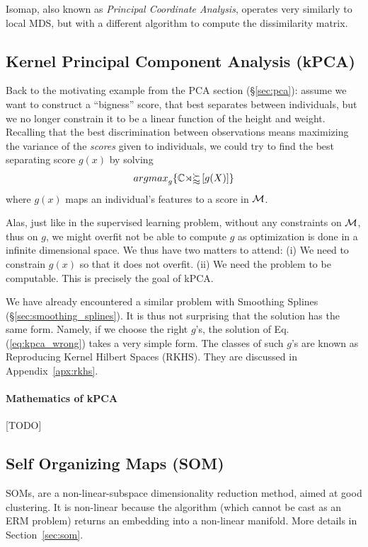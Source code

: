 \documentclass[12pt,a4paper]{article}
\begin{document}
Isomap, also known as \emph{Principal Coordinate Analysis}, operates very similarly to local MDS, but with a different algorithm to compute the dissimilarity matrix.




\subsection{Kernel Principal Component Analysis (kPCA)}
\label{sec:kpca}

Back to the motivating example from the PCA section (\S\ref{sec:pca}): assume we want to construct a ``bigness'' score, that best separates between individuals, but we no longer constrain it to be a linear function of the height and weight.
Recalling that the best discrimination between observations means maximizing the variance of the \emph{scores} given to individuals, we could try to find the best separating score $g(x)$ by solving 
\begin{align}
\label{eq:kpca_wrong}
\textstyle{\mathop{argmax}_{g}}\{ \mathbb{Cov} \left[ g(X) \right] \}
\end{align}
where $g(x)$ maps an individual's features to a score in $\mathcal{M}$.

Alas, just like in the supervised learning problem, without any constraints on $\mathcal{M}$, thus on $g$, we might overfit \andor not be able to compute $g$ as optimization is done in a infinite dimensional space. 
We thus have two matters to attend:
(i) We need to constrain $g(x)$ so that it does not overfit.
(ii) We need the problem to be computable.
This is precisely the goal of kPCA. 

We have already encountered a similar problem with Smoothing Splines (\S\ref{sec:smoothing_splines}). It is thus not surprising that the solution has the same form. 
Namely, if we choose the right $g$'s, the solution of Eq.(\ref{eq:kpca_wrong}) takes a very simple form. 
The classes of such $g$'s are known as Reproducing Kernel Hilbert Spaces (RKHS). 
They are discussed in Appendix~\ref{apx:rkhs}.



\paragraph{Mathematics of kPCA}
[TODO]




\subsection{Self Organizing Maps (SOM)}
SOMs, are a non-linear-subspace dimensionality reduction method, aimed at good clustering. 
It is non-linear because the algorithm (which cannot be cast as an ERM problem) returns an embedding into a non-linear manifold.
More details in Section~\ref{sec:som}.
\end{document}
